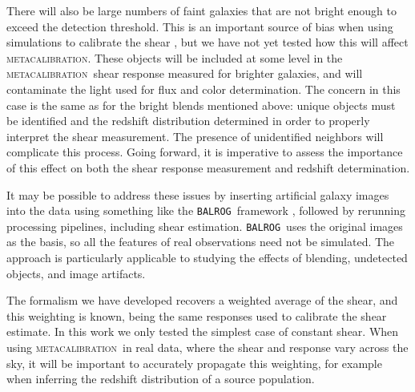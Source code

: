 \documentclass[iop, twocolappendix, appendixfloats, numberedappendix, apj]{emulateapj}
\newcommand{\mcal}{\textsc{metacalibration}}
\newcommand{\balrog}{\texttt{BALROG}}
\begin{document}
There will also be large numbers of faint galaxies that are not bright enough
to exceed the detection threshold. This is an important source of bias when
using simulations to calibrate the shear \citep[see e.g.][]{Hoekstra2017}, but
we have not yet tested how this will affect \mcal.  These objects will be
included at some level in the \mcal\ shear response measured for brighter
galaxies, and will contaminate the light used for flux and color determination.
The concern in this case is the same as for the bright blends mentioned above:
unique objects must be identified and the redshift distribution determined in
order to properly interpret the shear measurement.  The presence of
unidentified neighbors will complicate this process.   Going forward, it is
imperative to assess the importance of this effect on both the shear response
measurement and redshift determination.  

It may be possible to address these issues by inserting artificial galaxy
images into the data using something like the \balrog\ framework
\citep{Balrog2016}, followed by rerunning processing pipelines, including
shear estimation.  \balrog\ uses the original images as the basis, so all the
features of real observations need not be simulated.  The approach is
particularly applicable to studying the effects of blending, undetected
objects, and image artifacts.

The formalism we have developed recovers a weighted average of the shear, and
this weighting is known, being the same responses used to calibrate the shear
estimate.  In this work we only tested the simplest case of constant shear.
When using \mcal\ in real data, where the shear and response vary across the
sky, it will be important to accurately propagate this weighting, for example
when inferring the redshift distribution of a source population.

\end{document}
